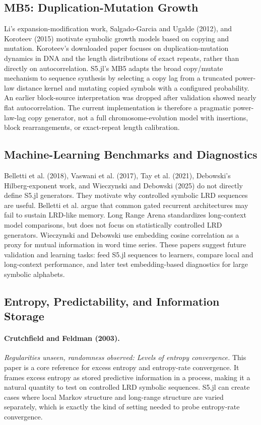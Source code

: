 \documentclass[11pt]{article}
\begin{document}
\subsection{MB5: Duplication-Mutation Growth}

Li's expansion-modification work, Salgado-Garcia and Ugalde (2012), and
Koroteev (2015) motivate symbolic growth models based on copying and mutation.
Koroteev's downloaded paper focuses on duplication-mutation dynamics in DNA and
the length distributions of exact repeats, rather than directly on
autocorrelation. S5.jl's MB5 adapts the broad copy/mutate mechanism to
sequence synthesis by selecting a copy lag from a truncated power-law distance
kernel and mutating copied symbols with a configured probability. An earlier
block-source interpretation was dropped after validation showed nearly flat
autocorrelation. The current implementation is therefore a pragmatic
power-law-lag copy generator, not a full chromosome-evolution model with
insertions, block rearrangements, or exact-repeat length calibration.

\subsection{Machine-Learning Benchmarks and Diagnostics}

Belletti et al. (2018), Vaswani et al. (2017), Tay et al. (2021), Debowski's
Hilberg-exponent work, and Wieczynski and Debowski (2025) do not directly
define S5.jl generators. They motivate why controlled symbolic LRD sequences
are useful. Belletti et al. argue that common gated recurrent architectures may
fail to sustain LRD-like memory. Long Range Arena standardizes long-context
model comparisons, but does not focus on statistically controlled LRD
generators. Wieczynski and Debowski use embedding cosine correlation as a proxy
for mutual information in word time series. These papers suggest future
validation and learning tasks: feed S5.jl sequences to learners, compare local
and long-context performance, and later test embedding-based diagnostics for
large symbolic alphabets.

\subsection{Entropy, Predictability, and Information Storage}

\paragraph{Crutchfield and Feldman (2003).}
\emph{Regularities unseen, randomness observed: Levels of entropy convergence.}
This paper is a core reference for excess entropy and entropy-rate convergence.
It frames excess entropy as stored predictive information in a process, making it
a natural quantity to test on controlled LRD symbolic sequences. S5.jl can create
cases where local Markov structure and long-range structure are varied
separately, which is exactly the kind of setting needed to probe entropy-rate
convergence.
\end{document}
